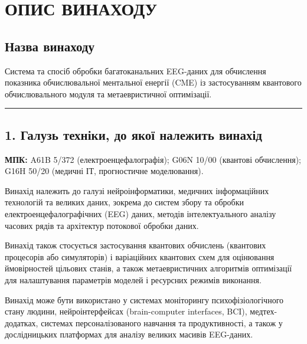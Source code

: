 \documentclass[12pt,a4paper]{article}
\begin{document}
\section{ОПИС ВИНАХОДУ}\label{ux43eux43fux438ux441-ux432ux438ux43dux430ux445ux43eux434ux443}



\subsection{Назва винаходу}\label{ux43dux430ux437ux432ux430-ux432ux438ux43dux430ux445ux43eux434ux443}



Система та спосіб обробки багатоканальних EEG-даних для обчислення показника обчислювальної ментальної енергії (CME) із застосуванням квантового обчислювального модуля та метаевристичної оптимізації.



\begin{center}\rule{0.5\linewidth}{0.5pt}\end{center}



\subsection{1. Галузь техніки, до якої належить винахід}\label{ux433ux430ux43bux443ux437ux44c-ux442ux435ux445ux43dux456ux43aux438-ux434ux43e-ux44fux43aux43eux457-ux43dux430ux43bux435ux436ux438ux442ux44c-ux432ux438ux43dux430ux445ux456ux434}



\textbf{МПК:} A61B 5/372 (електроенцефалографія); G06N 10/00 (квантові обчислення); G16H 50/20 (медичні ІТ, прогностичне моделювання).



Винахід належить до галузі нейроінформатики, медичних інформаційних технологій та великих даних, зокрема до систем збору та обробки електроенцефалографічних (EEG) даних, методів інтелектуального аналізу часових рядів та архітектур потокової обробки даних.



Винахід також стосується застосування квантових обчислень (квантових процесорів або симуляторів) і варіаційних квантових схем для оцінювання ймовірностей цільових станів, а також метаевристичних алгоритмів оптимізації для налаштування параметрів моделей і ресурсних режимів виконання.



Винахід може бути використано у системах моніторингу психофізіологічного стану людини, нейроінтерфейсах (brain-computer interfaces, BCI), медтех-додатках, системах персоналізованого навчання та продуктивності, а також у дослідницьких платформах для аналізу великих масивів EEG-даних.
\end{document}
